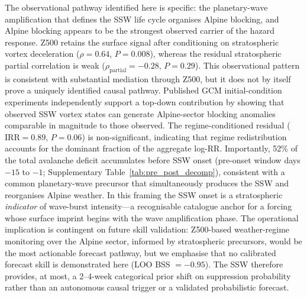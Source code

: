 \documentclass[11pt,letterpaper]{article}
\begin{document}
The observational pathway identified here is specific: the planetary-wave amplification that defines the SSW life cycle organises Alpine blocking, and Alpine blocking appears to be the strongest observed carrier of the hazard response. Z500 retains the surface signal after conditioning on stratospheric vortex deceleration ($\rho = 0.64$, $P = 0.008$), whereas the residual stratospheric partial correlation is weak ($\rho_{\mathrm{partial}} = -0.28$, $P = 0.29$). This observational pattern is consistent with substantial mediation through Z500, but it does not by itself prove a uniquely identified causal pathway. Published GCM initial-condition experiments independently support a top-down contribution by showing that observed SSW vortex states can generate Alpine-sector blocking anomalies comparable in magnitude to those observed\cite{Hitchcock2013,Baldwin2021,Kidston2015}. The regime-conditioned residual ($\mathrm{IRR} = 0.89$, $P = 0.06$) is non-significant, indicating that regime redistribution accounts for the dominant fraction of the aggregate log-RR. Importantly, 52\% of the total avalanche deficit accumulates before SSW onset (pre-onset window days $-15$ to $-1$; Supplementary Table~\ref{tab:pre_post_decomp}), consistent with a common planetary-wave precursor that simultaneously produces the SSW and reorganises Alpine weather. In this framing the SSW onset is a stratospheric \emph{indicator} of wave-burst intensity---a recognisable catalogue anchor for a forcing whose surface imprint begins with the wave amplification phase. The operational implication is contingent on future skill validation: Z500-based weather-regime monitoring over the Alpine sector, informed by stratospheric precursors, would be the most actionable forecast pathway, but we emphasise that no calibrated forecast skill is demonstrated here (LOO BSS $= -0.95$). The SSW therefore provides, at most, a 2--4-week categorical prior shift on suppression probability rather than an autonomous causal trigger or a validated probabilistic forecast.
\end{document}
